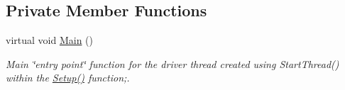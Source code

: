 \subsection*{Private Member Functions}
\begin{CompactItemize}
\item 
\hypertarget{classSurveyor_e6ae9ea8d60a2038b6dacdab7ccee458}{
virtual void \hyperlink{classSurveyor_e6ae9ea8d60a2038b6dacdab7ccee458}{Main} ()}
\label{classSurveyor_e6ae9ea8d60a2038b6dacdab7ccee458}

\begin{CompactList}\small\item\em Main \char`\"{}entry point\char`\"{} function for the driver thread created using StartThread() within the \hyperlink{classSurveyor_c127d6028c08790fe79902b1b8359468}{Setup()} function;. \item\end{CompactList}\end{CompactItemize}
